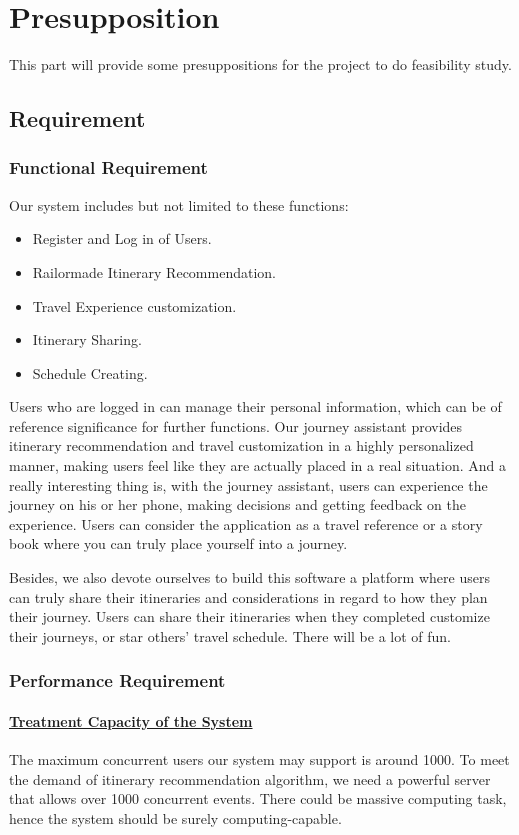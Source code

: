 \documentclass[10pt]{article}
\begin{document}
\section{Presupposition}
This part will provide some presuppositions for the project to do feasibility study.

\subsection{Requirement}
\subsubsection{Functional Requirement}
Our system includes but not limited to these functions: 

\begin{itemize}
  \item Register and Log in of Users.
  \item Railormade Itinerary Recommendation.
  \item Travel Experience customization.
  \item Itinerary Sharing.
  \item Schedule Creating.
\end{itemize}

Users who are logged in can manage their personal information, which can be of reference significance for further functions. Our journey assistant provides itinerary recommendation and travel customization in a highly personalized manner, making users feel like they are actually placed in a real situation. And a really interesting thing is, with the journey assistant, users can experience the journey on his or her phone, making decisions and getting feedback on the experience. Users can consider the application as a travel reference or a story book where you can truly place yourself into a journey. 

Besides, we also devote ourselves to build this software a platform where users can truly share their itineraries and considerations in regard to how they plan their journey. Users can share their itineraries when they completed customize their journeys, or star others' travel schedule. There will be a lot of fun.

\subsubsection{Performance Requirement}
\paragraph{\underline{Treatment Capacity of the System}} The maximum concurrent users our system may support is around 1000. To meet the demand of itinerary recommendation algorithm, we need a powerful server that allows over 1000 concurrent events. There could be massive computing task, hence the system should be surely computing-capable.
\end{document}

